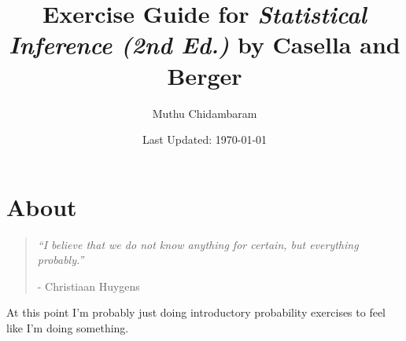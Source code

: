 \documentclass{article}
\begin{document}
\title{Exercise Guide for \textit{Statistical Inference (2nd Ed.)} by Casella and Berger}
\author{Muthu Chidambaram}
\date{Last Updated: \today}

\maketitle

\tableofcontents
\newpage 

\section*{About}

\begin{quote}
        \textit{``I believe that we do not know anything for certain, but everything probably.''} 
        
        - Christiaan Huygens
\end{quote}

At this point I'm probably just doing introductory probability exercises to feel like I'm doing something.


\end{document}
